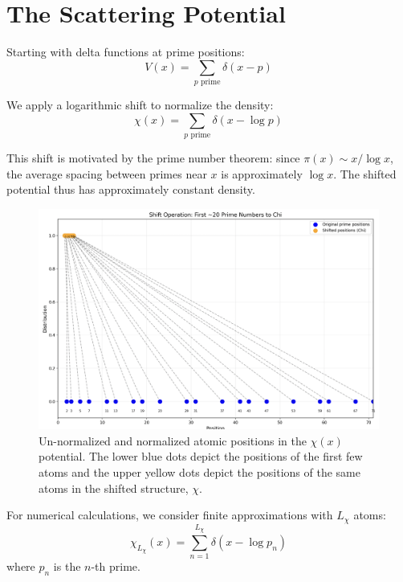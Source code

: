 \documentclass[11pt, oneside]{article}
\begin{document}
\section{The Scattering Potential}

Starting with delta functions at prime positions:
\begin{equation}
V(x) = \sum_{p \text{ prime}} \delta(x - p)
\end{equation}

We apply a logarithmic shift to normalize the density:
\begin{equation}
\chi(x) = \sum_{p \text{ prime}} \delta(x - \log p)
\end{equation}

This shift is motivated by the prime number theorem: since $\pi(x) \sim x/\log x$, the average spacing between primes near $x$ is approximately $\log x$. The shifted potential thus has approximately constant density.

\begin{figure}[htbp]
\begin{center}
    \includegraphics[width=0.8\linewidth]{normalizing.png}
\caption{Un-normalized and normalized atomic positions in the $\chi(x)$ potential. The lower blue dots depict the positions of the first few atoms and the upper yellow dots depict the positions of the same atoms in the shifted structure, $\chi$.}
\label{fig:normalized_positions}
\end{center}
\end{figure}

For numerical calculations, we consider finite approximations with $L_\chi$ atoms:
\begin{equation}
\chi_{L_\chi}(x) = \sum_{n=1}^{L_\chi} \delta(x - \log p_n)
\end{equation}
where $p_n$ is the $n$-th prime.
\end{document}
